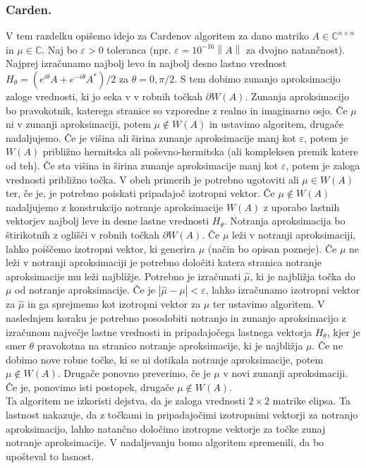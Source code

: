 \documentclass[12pt,a4paper]{amsart}
\theoremstyle{definition}
\theoremstyle{plain}
\newcommand{\C}{\mathbb C}
\newcommand{\abs}[1]{ \left\lvert#1\right\rvert}
\newcommand{\norm}[1]{\left\lVert#1\right\rVert}
\begin{document}
\subsubsection{Carden.}
V tem razdelku opišemo idejo za Cardenov algoritem za dano matriko $A \in \C^{n\times n}$ in $\mu \in \C$. Naj bo $\varepsilon >0$ toleranca (npr. $\varepsilon=10^{-16}\norm{A}$ za dvojno natančnost). \\
Najprej izračunamo najbolj levo in najbolj desno lastno vrednost $H_\theta =(e^{i\theta}A+e^{-i\theta}A^\ast)/2$ za $\theta =0,\pi/2$. S tem dobimo zunanjo aproksimacijo zaloge vrednosti, ki jo seka v v robnih točkah $\partial W(A)$. Zunanja aproksimacijo bo pravokotnik, katerega stranice so vzporedne z realno in imaginarno osjo. Če $\mu$ ni v zunanji aproksimaciji, potem $\mu \not \in W(A)$ in ustavimo algoritem, drugače nadaljujemo. Če je višina ali širina zunanje aproksimacije manj kot $\varepsilon$, potem je $W(A)$ približno hermitska ali poševno-hermitska (ali kompleksen premik katere od teh). Če sta višina in širina zunanje aproksimacije manj kot $\varepsilon$, potem je zaloga vrednosti približno točka. V obeh primerih je potrebno ugotoviti ali $\mu \in W(A)$ ter, če je, je potrebno poiskati pripadajoč izotropni vektor. Če $\mu \not \in W(A)$ nadaljujemo z konstrukcijo notranje aproksimacije $W(A)$ z uporabo lastnih vektorjev najbolj leve in desne lastne vrednosti $H_{\theta}$. Notranja aproksimacija bo štirikotnih z oglišči v robnih točkah $\partial W(A)$. Če $\mu$ leži v notranji aproksimaciji, lahko poiščemo izotropni vektor, ki generira $\mu$ (način bo opisan pozneje). Če $\mu$ ne leži v notranji aproksimaciji je potrebno določiti katera stranica notranje aproksimacije mu leži najbližje. Potrebno je izračunati $\hat{\mu}$, ki je najbližja točka do $\mu$ od notranje aproksimacije. Če je $\abs{\hat{\mu}-\mu}<\varepsilon$, lahko izračunamo izotropni vektor za $\hat{\mu}$ in ga sprejmemo kot izotropni vektor za $\mu$ ter ustavimo algoritem. V naslednjem koraku je potrebno posodobiti notranjo in zunanjo aproksimacijo z izračunom največje lastne vrednosti in pripadajočega lastnega vektorja $H_{\theta}$, kjer je smer $\theta$ pravokotna na stranico notranje aproksimacije, ki je najbližja $\mu$. Če ne dobimo nove robne točke, ki se ni dotikala notranje aproksimacije, potem $\mu \not \in W(A)$. Drugače ponovno preverimo, če je $\mu$  v novi zunanji aproksimaciji. Če je, ponovimo isti postopek, drugače $\mu \not \in W(A)$. \\
Ta algoritem ne izkoristi dejstva, da je zaloga vrednosti $2\times2$ matrike elipsa. Ta lastnost nakazuje, da z točkami in pripadajočimi izotropnimi vektorji za notranjo aproksimacijo, lahko natančno določimo izotropne vektorje za točke zunaj notranje aproksimacije. V nadaljevanju bomo algoritem spremenili, da bo upošteval to lasnost.
\end{document}
